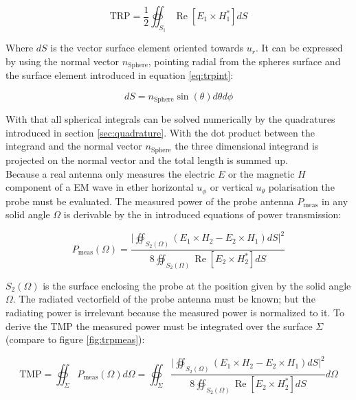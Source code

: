 \begin{equation}
\text{TRP}=\frac{1}{2}  \oiint_{S_1} \operatorname{Re}\left[E_1	\times H_1^*\right]dS
\end{equation}

Where $dS$ is the vector surface element oriented towards $u_r$. It can be expressed by using the normal vector $n_\text{Sphere}$, pointing radial from the spheres surface and the surface element introduced in equation \ref{eq:trpint}:

\begin{equation}
dS = n_\text{Sphere}\sin\left(\theta\right) d\theta d\phi
\end{equation}

With that all spherical integrals can be solved numerically by the quadratures introduced in section \ref{sec:quadrature}. With the dot product between the integrand and the normal vector $n_\text{Sphere}$ the three dimensional integrand is projected on the normal vector and the total length is summed up.\\
Because a real antenna only measures the electric $E$ or the magnetic $H$ component of a \ac{EM} wave in ether horizontal $u_\phi$ or vertical $u_\theta$ polarisation the probe must be evaluated. The measured power of the probe antenna $P_\text{meas}$ in any solid angle $\Omega$ is derivable by the in \cite{book} introduced equations of power transmission:

\begin{equation}
P_\text{meas}\left(\Omega\right) = \frac{\big|\oiint_{S_2\left(\Omega\right)}\left(E_1\times H_2 - E_2\times H_1\right)dS\big|^2}{8\oiint_{S_2\left(\Omega\right)}\operatorname{Re}\left[E_2\times H_2^*\right]dS}
\end{equation}

$S_2\left(\Omega\right)$  is the surface enclosing the probe at the position given by the solid angle $\Omega$. The radiated vectorfield of the probe antenna must be known; but the radiating power is irrelevant because the measured power is normalized to it. To derive the \ac{TMP} the measured power must be integrated over the surface $\Sigma$ (compare to figure \ref{fig:trpmeas}): \cite{mypaper}

\begin{equation}
\text{TMP}=\oiint_\Sigma P_\text{meas}\left(\Omega\right)d\Omega = \oiint_\Sigma \frac{\big|\oiint_{S_2\left(\Omega\right)}\left(E_1\times H_2 - E_2\times H_1\right)dS\big|^2}{8\oiint_{S_2\left(\Omega\right)}\operatorname{Re}\left[E_2\times H_2^*\right]dS} d\Omega
\label{eq:trpint}
\end{equation}  

